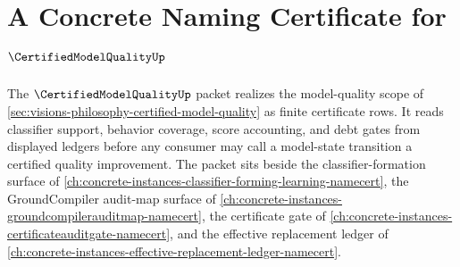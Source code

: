 \chapter{A Concrete Naming Certificate for $\CertifiedModelQualityUp$}
\label{ch:concrete-instances-certified-model-quality-namecert}

The $\CertifiedModelQualityUp$ packet realizes the model-quality scope of \autoref{sec:visions-philosophy-certified-model-quality} as finite certificate rows. It reads classifier support, behavior coverage, score accounting, and debt gates from displayed ledgers before any consumer may call a model-state transition a certified quality improvement. The packet sits beside the classifier-formation surface of \autoref{ch:concrete-instances-classifier-forming-learning-namecert}, the GroundCompiler audit-map surface of \autoref{ch:concrete-instances-groundcompilerauditmap-namecert}, the certificate gate of \autoref{ch:concrete-instances-certificateauditgate-namecert}, and the effective replacement ledger of \autoref{ch:concrete-instances-effective-replacement-ledger-namecert}.

